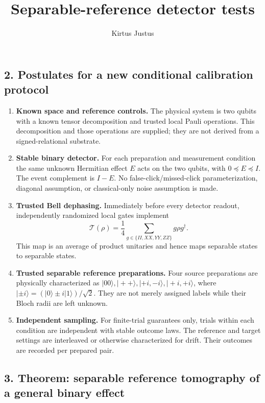 \documentclass[
  10pt,
  a4paper,
]{article}
\title{Separable-reference detector tests}
\author{Kirtus Justus}
\date{}
\providecommand{\tightlist}{%
  \setlength{\itemsep}{0pt}\setlength{\parskip}{0pt}}
\begin{document}
\maketitle

\subsection{2. Postulates for a new conditional calibration protocol}\label{postulates-for-a-new-conditional-calibration-protocol}

\begin{enumerate}
\def\labelenumi{\arabic{enumi}.}
\tightlist
\item
  \textbf{Known space and reference controls.} The physical system is two qubits with a known tensor decomposition and trusted local Pauli operations. This decomposition and those operations are supplied; they are not derived from a signed-relational substrate.
\item
  \textbf{Stable binary detector.} For each preparation and measurement condition the same unknown Hermitian effect \(E\) acts on the two qubits, with \(0\preceq E\preceq I\). The event complement is \(I-E\). No false-click/missed-click parameterization, diagonal assumption, or classical-only noise assumption is made.
\item
  \textbf{Trusted Bell dephasing.} Immediately before every detector readout, independently randomized local gates implement \[
   \mathcal T(\rho)=\frac14\sum_{g\in\{II,XX,YY,ZZ\}}g\rho g^\dagger.
  \] This map is an average of product unitaries and hence maps separable states to separable states.
\item
  \textbf{Trusted separable reference preparations.} Four source preparations are physically characterized as \(|00\rangle, |++\rangle,|+i,-i\rangle,|+i,+i\rangle\), where \(|\pm i\rangle=(|0\rangle\pm i|1\rangle)/\sqrt2\). They are not merely assigned labels while their Bloch radii are left unknown.
\item
  \textbf{Independent sampling.} For finite-trial guarantees only, trials within each condition are independent with stable outcome laws. The reference and target settings are interleaved or otherwise characterized for drift. Their outcomes are recorded per prepared pair.
\end{enumerate}

\subsection{3. Theorem: separable reference tomography of a general binary effect}\label{theorem-separable-reference-tomography-of-a-general-binary-effect}
\end{document}
